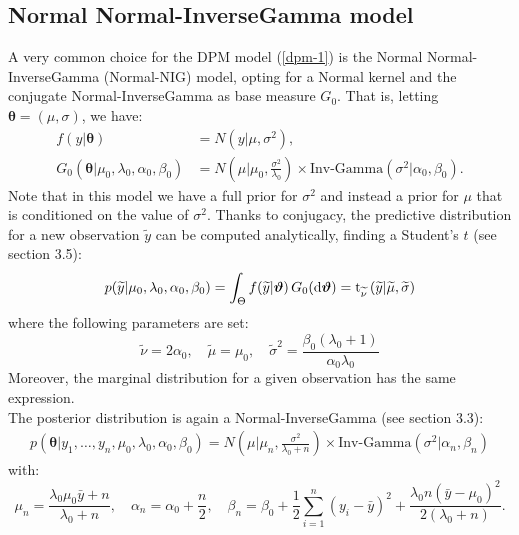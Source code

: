 \subsection{Normal Normal-InverseGamma model} \label{nnig}
A very common choice for the DPM model (\ref{dpm-1}) is the Normal Normal-InverseGamma (Normal-NIG) model, opting for a Normal kernel and the conjugate Normal-InverseGamma as base measure $G_0$. That is, letting $\boldsymbol\theta=(\mu,\sigma)$, we have:
\begin{equation}
	\begin{aligned}
		f(y|\boldsymbol\theta)&=N(y| \mu ,\sigma^2),  \\
		G_0(\boldsymbol\theta|\mu_0,\lambda_0, \alpha_0, 	\beta_0)
		&=N\left(\mu | \mu_0 ,\frac{\sigma^2} {\lambda_0}\right) \times \text{Inv-Gamma}(\sigma^2|\alpha_0, \beta_0 ).
	\end{aligned}
\end{equation}
Note that in this model we have a full prior for $\sigma^2$ and instead a prior for $\mu$ that is conditioned on the value of $\sigma^2$.
Thanks to conjugacy, the predictive distribution for a new observation $\widetilde{y}$ can be computed analytically, finding a Student's $t$ (see \cite{integral} section 3.5):
\begin{align*}
	p(\widetilde{y}|\mu_0,\lambda_0, \alpha_0, \beta_0) =
	\int_\Theta f(\widetilde{y}|\boldsymbol{\vartheta}) \, G_0(\mathrm d\boldsymbol{\vartheta}) =
	\text{t}_{\widetilde \nu}\left(\widetilde{y}|\widetilde{\mu},\widetilde{\sigma}\right)
\end{align*}
where the following parameters are set:
$$
	\widetilde{\nu}=2 \alpha_0, \quad
	\widetilde{\mu}=\mu_0, \quad
	\widetilde{\sigma}^2= \frac{\beta_0(\lambda_0+1)}{\alpha_0 \lambda_0}
$$
Moreover, the marginal distribution for a given observation has the same expression. \\
The posterior distribution is again a Normal-InverseGamma (see \cite{integral} section 3.3):
\begin{align*}
	p(\boldsymbol\theta|y_1,\dots,y_n,\mu_0,\lambda_0, \alpha_0, \beta_0)=N\left(\mu | \mu_n ,\frac{\sigma^2} {\lambda_0 + n}\right) \times \text{Inv-Gamma}(\sigma^2|\alpha_n, \beta_n )
\end{align*}
with:
$$
\mu_n=\frac{\lambda_0 \mu_0 \bar{y} + n}{\lambda_0 + n}, \quad \alpha_n= \alpha_0 + \frac{n}{2}, \quad \beta_n= \beta_0 + \frac{1}{2}\sum_{i=1}^{n} (y_i-\bar{y})^2 + \frac{\lambda_0 n(\bar{y}-\mu_0)^2}{2(\lambda_0 + n)}.
$$

